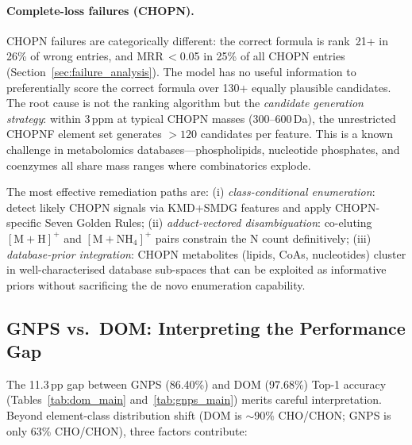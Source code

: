 \documentclass[journal=jcisd8]{achemso}
\begin{document}
\paragraph{Complete-loss failures (CHOPN).}
CHOPN failures are categorically different: the correct formula is rank~21+
in 26\% of wrong entries, and MRR\,$<$0.05 in 25\% of all CHOPN entries (Section~\ref{sec:failure_analysis}).
The model has no useful information to preferentially score the correct formula
over 130+ equally plausible candidates.  The root cause is not the ranking
algorithm but the \emph{candidate generation strategy}: within 3\,ppm at typical
CHOPN masses (300--600\,Da), the unrestricted CHOPNF element set generates
$>120$ candidates per feature.  This is a known challenge in metabolomics
databases---phospholipids, nucleotide phosphates, and coenzymes all share mass
ranges where combinatorics explode.

The most effective remediation paths are:
(i) \emph{class-conditional enumeration}: detect likely CHOPN signals via
    KMD+SMDG features and apply CHOPN-specific Seven Golden Rules;
(ii) \emph{adduct-vectored disambiguation}: co-eluting $[\text{M}+\text{H}]^+$
    and $[\text{M}+\text{NH}_4]^+$ pairs constrain the N count definitively;
(iii) \emph{database-prior integration}: CHOPN metabolites (lipids, CoAs,
    nucleotides) cluster in well-characterised database sub-spaces that can
    be exploited as informative priors without sacrificing the de novo
    enumeration capability.

\subsection{GNPS vs.\ DOM: Interpreting the Performance Gap}

The 11.3\,pp gap between GNPS (86.40\%) and DOM (97.68\%) Top-1 accuracy
(Tables~\ref{tab:dom_main} and~\ref{tab:gnps_main}) merits careful interpretation.  Beyond element-class distribution shift (DOM is $\sim$90\%
CHO/CHON; GNPS is only 63\% CHO/CHON), three factors contribute:
\end{document}
